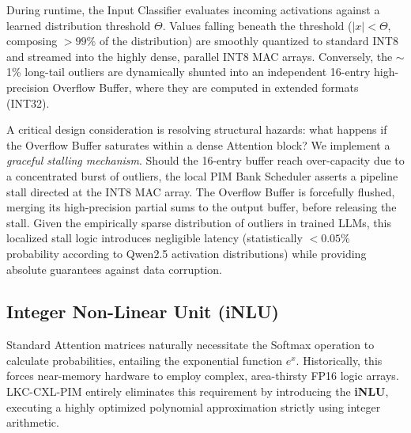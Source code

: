 \documentclass[10pt,conference]{IEEEtran}
\begin{document}
During runtime, the Input Classifier evaluates incoming activations against a learned distribution threshold $\Theta$. Values falling beneath the threshold ($|x| < \Theta$, composing $>99\%$ of the distribution) are smoothly quantized to standard INT8 and streamed into the highly dense, parallel INT8 MAC arrays. Conversely, the $\sim$1\% long-tail outliers are dynamically shunted into an independent 16-entry high-precision Overflow Buffer, where they are computed in extended formats (INT32). 

A critical design consideration is resolving structural hazards: what happens if the Overflow Buffer saturates within a dense Attention block? We implement a \textit{graceful stalling mechanism}. Should the 16-entry buffer reach over-capacity due to a concentrated burst of outliers, the local PIM Bank Scheduler asserts a pipeline stall directed at the INT8 MAC array. The Overflow Buffer is forcefully flushed, merging its high-precision partial sums to the output buffer, before releasing the stall. Given the empirically sparse distribution of outliers in trained LLMs, this localized stall logic introduces negligible latency (statistically $<0.05\%$ probability according to Qwen2.5 activation distributions) while providing absolute guarantees against data corruption.

\subsection{Integer Non-Linear Unit (iNLU)}
Standard Attention matrices naturally necessitate the Softmax operation to calculate probabilities, entailing the exponential function $e^x$. Historically, this forces near-memory hardware to employ complex, area-thirsty FP16 logic arrays. LKC-CXL-PIM entirely eliminates this requirement by introducing the \textbf{iNLU}, executing a highly optimized polynomial approximation strictly using integer arithmetic.
\end{document}
